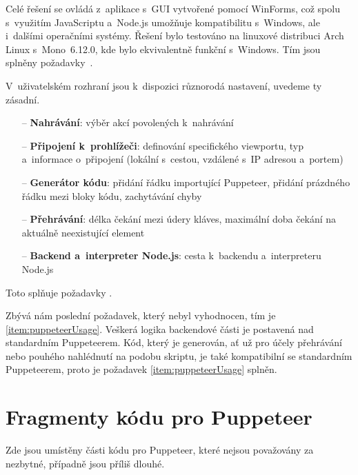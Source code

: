 \documentclass[12pt, a4paper, twoside]{article}
\begin{document}
	Celé řešení se ovládá z~aplikace s~GUI vytvořené pomocí WinForms, což spolu s~využitím JavaScriptu a~Node.js umožňuje kompatibilitu s~Windows, ale i~dalšími operačními systémy. Řešení bylo testováno na linuxové distribuci Arch Linux s~Mono~6.12.0, kde bylo ekvivalentně funkční s~Windows. Tím jsou splněny požadavky~\mbox{}.
	
	V~uživatelském rozhraní jsou k~dispozici různorodá nastavení, uvedeme ty zásadní.
	\begin{itemize}
		\item[--] \textbf{Nahrávání}: výběr akcí povolených k~nahrávání
		\item[--] \textbf{Připojení k~prohlížeči}: definování specifického viewportu, typ a~informace o~připojení  (lokální s~cestou, vzdálené s~IP adresou a~portem)
		\item[--] \textbf{Generátor kódu}: přidání řádku importující Puppeteer, přidání prázdného řádku mezi bloky kódu, zachytávání chyby
		\item[--] \textbf{Přehrávání}: délka čekání mezi údery kláves, maximální doba čekání na aktuálně neexistující element
		\item[--] \textbf{Backend a~interpreter Node.js}: cesta k~backendu a~interpreteru Node.js
	\end{itemize}
	Toto splňuje požadavky .
	
	Zbývá nám poslední požadavek, který nebyl vyhodnocen, tím je \cref{item:puppeteerUsage}. Veškerá logika backendové části je postavená nad standardním Puppeteerem. Kód, který je generován, ať už pro účely přehrávání nebo pouhého nahlédnutí na podobu skriptu, je také kompatibilní se standardním Puppeteerem, proto je požadavek \cref{item:puppeteerUsage} splněn.
	\newpage
	\setcounter{secnumdepth}{2}
	\setcounter{section}{0}
	\appendix
	\section{Fragmenty kódu pro Puppeteer}
	\label{appx:puppeteerCode}
	Zde jsou umístěny části kódu pro Puppeteer, které nejsou považovány za nezbytné, případně jsou příliš dlouhé.
\end{document}
